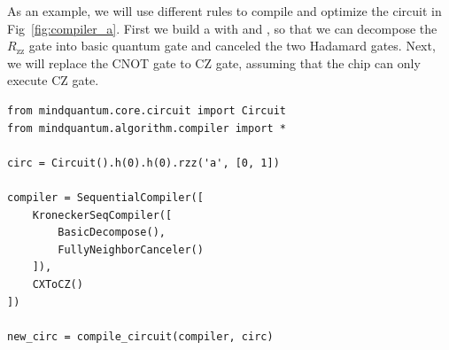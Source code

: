 As an example, we will use different rules to compile and optimize the circuit in Fig~\ref{fig:compiler_a}. First we build a \KroneckerSeqCompiler with \BasicDecompose and \FullyNeighborCanceler, so that we can decompose the $R_\text{zz}$ gate into basic quantum gate and canceled the two Hadamard gates. Next, we will replace the CNOT gate to CZ gate, assuming that the chip can only execute CZ gate.
\begin{lstlisting}
from mindquantum.core.circuit import Circuit
from mindquantum.algorithm.compiler import *

circ = Circuit().h(0).h(0).rzz('a', [0, 1])

compiler = SequentialCompiler([
    KroneckerSeqCompiler([
        BasicDecompose(),
        FullyNeighborCanceler()
    ]),
    CXToCZ()
])

new_circ = compile_circuit(compiler, circ)
\end{lstlisting}
